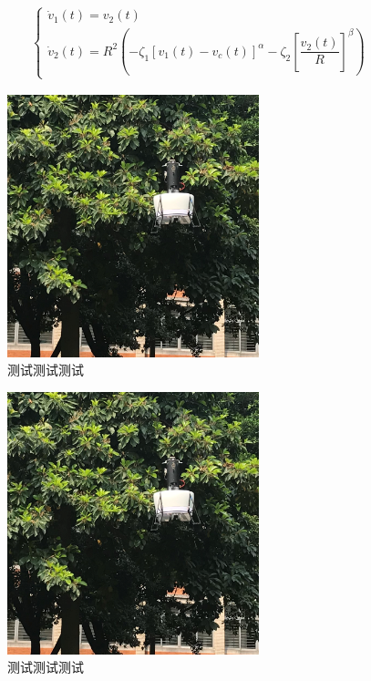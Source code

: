 \begin{align}
\left\{\begin{array}{l}
\dot{v}_{1}(t)=v_{2}(t) \\
\dot{v}_{2}(t)=R^{2}\left(-\zeta_{1}\left[v_{1}(t)-v_c(t)\right]^{\alpha}-\zeta_{2}\left[\dfrac{v_{2}(t)}{R}\right]^{\beta}\right)
\end{array}\right.	
\end{align}
\begin{figure}[htbp]
	\centering	
	\includegraphics[scale=1]{Fig/DFUAV_f31.png}
	\caption{\label{fig_case1}测试测试测试}
\end{figure}
\begin{figure}[htbp]
	\centering	
	\includegraphics[scale=1]{Fig/DFUAV_f31.png}
	\caption{\label{fig_case2}测试测试测试}
\end{figure}
